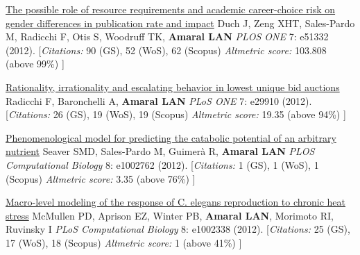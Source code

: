 \NumberedItem{\makebox[0.8cm][r]{[98]}}
\href{/people/amaral/possible-role-resource-requirements-and-academic-career-choice-risk-gender-differences-publication-rate-and-impact}
{The possible role of resource requirements and academic career-choice risk on gender differences in publication rate and impact}
\newline
Duch J, Zeng XHT, Sales-Pardo M, Radicchi F, Otis S, Woodruff TK, {\textbf{Amaral LAN}}
\newline
\textit{PLOS ONE}
    7:
e51332 (2012).
    \newline
    \hfill [{\em{Citations:}} 90 (GS),
    52 (WoS), 62 (Scopus)
        {\hspace*{1cm} \em{Altmetric score:}}  103.808 (above 99\%)
    ]
\newline
\Gap
~
\Gap

\NumberedItem{\makebox[0.8cm][r]{[97]}}
\href{/people/amaral/rationality-irrationality-and-escalating-behavior-lowest-unique-bid-auctions}
{Rationality, irrationality and escalating behavior in lowest unique bid auctions}
\newline
Radicchi F, Baronchelli A, {\textbf{Amaral LAN}}
\newline
\textit{PLoS ONE}
    7:
e29910 (2012).
    \newline
    \hfill [{\em{Citations:}} 26 (GS),
    19 (WoS), 19 (Scopus)
        {\hspace*{1cm} \em{Altmetric score:}}  19.35 (above 94\%)
    ]
\newline
\Gap
~
\Gap

\NumberedItem{\makebox[0.8cm][r]{[96]}}
\href{/people/amaral/phenomenological-model-predicting-catabolic-potential-arbitrary-nutrient}
{Phenomenological model for predicting the catabolic potential of an arbitrary nutrient}
\newline
Seaver SMD, Sales-Pardo M, Guimer\`a R, {\textbf{Amaral LAN}}
\newline
\textit{PLOS Computational Biology}
    8:
e1002762 (2012).
    \newline
    \hfill [{\em{Citations:}} 1 (GS),
    1 (WoS), 1 (Scopus)
        {\hspace*{1cm} \em{Altmetric score:}}  3.35 (above 76\%)
    ]
\newline
\Gap
~
\Gap

\NumberedItem{\makebox[0.8cm][r]{[95]}}
\href{/people/amaral/macro-level-modeling-response-_c-elegans_-reproduction-chronic-heat-stress}
{Macro-level modeling of the response of C. elegans reproduction to chronic heat stress}
\newline
McMullen PD, Aprison EZ, Winter PB, {\textbf{Amaral LAN}}, Morimoto RI, Ruvinsky I
\newline
\textit{PLoS Computational Biology}
    8:
e1002338 (2012).
    \newline
    \hfill [{\em{Citations:}} 25 (GS),
    17 (WoS), 18 (Scopus)
        {\hspace*{1cm} \em{Altmetric score:}}  1 (above 41\%)
    ]
\newline
\Gap
~
\Gap

